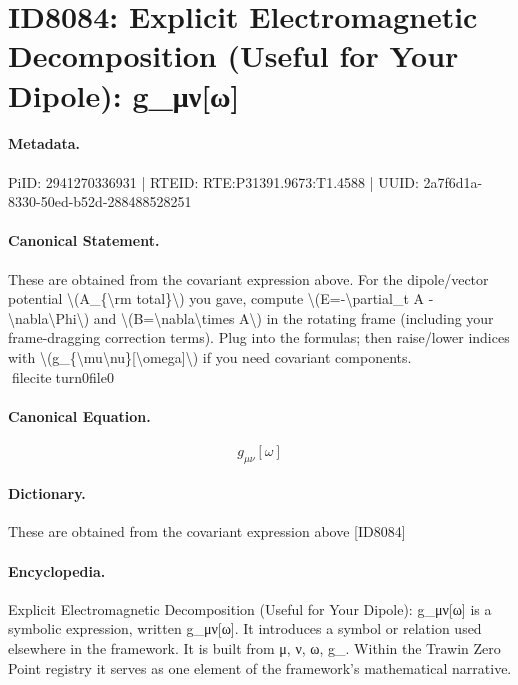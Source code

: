 \section*{ID8084: Explicit Electromagnetic Decomposition (Useful for Your Dipole): g\_μν[ω]}
\paragraph{Metadata.}
PiID: 2941270336931 | RTEID: RTE:P31391.9673:T1.4588 | UUID: 2a7f6d1a-8330-50ed-b52d-288488528251

\paragraph{Canonical Statement.}
These are obtained from the covariant expression above. For the dipole/vector potential \textbackslash{}(A\_\{\textbackslash{}rm total\}\textbackslash{}) you gave, compute \textbackslash{}(E=-\textbackslash{}partial\_t A - \textbackslash{}nabla\textbackslash{}Phi\textbackslash{}) and \textbackslash{}(B=\textbackslash{}nabla\textbackslash{}times A\textbackslash{}) in the rotating frame (including your frame-dragging correction terms). Plug into the formulas; then raise/lower indices with \textbackslash{}(g\_\{\textbackslash{}mu\textbackslash{}nu\}[\textbackslash{}omega]\textbackslash{}) if you need covariant components. fileciteturn0file0

\paragraph{Canonical Equation.}
\[
g_{\mu\nu}[\omega]
\]

\paragraph{Dictionary.}
These are obtained from the covariant expression above [ID8084]

\paragraph{Encyclopedia.}
Explicit Electromagnetic Decomposition (Useful for Your Dipole): g\_μν[ω] is a symbolic expression, written g\_μν[ω]. It introduces a symbol or relation used elsewhere in the framework. It is built from μ, ν, ω, g\_. Within the Trawin Zero Point registry it serves as one element of the framework's mathematical narrative.
